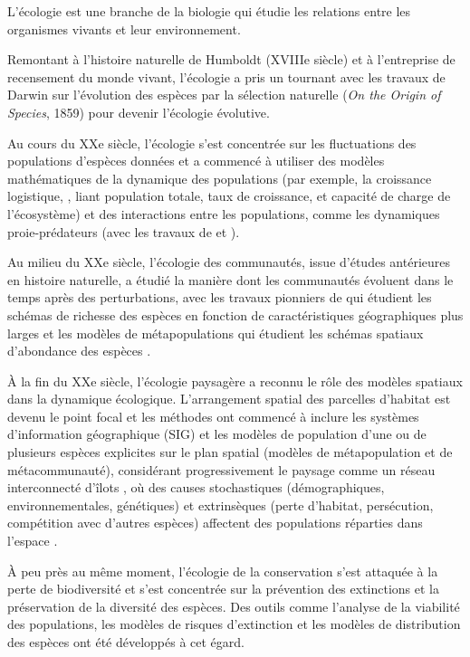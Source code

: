 \begin{tcolorbox}[breakable, 
				  colback=verylightgray, 
				  colframe=gray!75!black, 
				  title= {Box 3 - Un bref aperçu de la modélisation écologique appliquée à la biodiversité},
				  fontupper=\small]
\par 
\justifying
L'écologie est une branche de la biologie qui étudie les relations entre les organismes vivants et leur environnement.

Remontant à l'histoire naturelle de Humboldt (XVIIIe siècle) et à l'entreprise de recensement du monde vivant, l'écologie a pris un tournant avec les travaux de Darwin sur l'évolution des espèces par la sélection naturelle (\textit{On the Origin of Species}, 1859) pour devenir l'écologie évolutive. 

Au cours du XXe siècle, l'écologie s'est concentrée sur les fluctuations des populations d'espèces données et a commencé à utiliser des modèles mathématiques de la dynamique des populations (par exemple, la croissance logistique, \citep{verhulst_1838}, liant population totale, taux de croissance, et capacité de charge de l'écosystème) et des interactions entre les populations, comme les dynamiques proie-prédateurs (avec les travaux de \cite{alfred_jlotka_elements_1925} et \cite{volterra_fluctuations_1926}). 

Au milieu du XXe siècle, l'écologie des communautés, issue d'études antérieures en histoire naturelle, a étudié la manière dont les communautés évoluent dans le temps après des perturbations, avec les travaux pionniers de \cite{macarthur_theory_1967} qui étudient les schémas de richesse des espèces en fonction de caractéristiques géographiques plus larges et les modèles de métapopulations qui étudient les schémas spatiaux d'abondance des espèces \citep{levins_demographic_1969, roughgarden_population_1974}.

À la fin du XXe siècle, l'écologie paysagère a reconnu le rôle des modèles spatiaux dans la dynamique écologique. L'arrangement spatial des parcelles d'habitat est devenu le point focal et les méthodes ont commencé à inclure les systèmes d'information géographique (SIG) et les modèles de population d'une ou de plusieurs espèces explicites sur le plan spatial (modèles de métapopulation et de métacommunauté),  considérant progressivement le paysage comme un réseau interconnecté d'îlots \citep{hanski_metapopulation_1998, urban_landscape_2001}, où des causes stochastiques (démographiques, environnementales, génétiques) et extrinsèques (perte d'habitat, persécution, compétition avec d'autres espèces) affectent des populations réparties dans l'espace \citep{hanski_metapopulation_1998}.

À peu près au même moment, l'écologie de la conservation \citep{soule_conservation_1986} s'est attaquée à la perte de biodiversité et s'est concentrée sur la prévention des extinctions et la préservation de la diversité des espèces.  Des outils comme l'analyse de la viabilité des populations, les modèles de risques d'extinction et les modèles de distribution des espèces ont été développés à cet égard. 
\end{tcolorbox}



